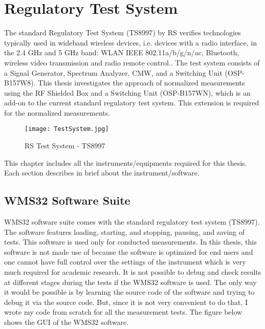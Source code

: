 \chapter{Regulatory Test System}  \label{chap:3}

The standard Regulatory Test System (TS8997) by \acs{RS}\textregistered{} verifies technologies typically used in wideband wireless devices, i.e. devices with a radio interface, in the 2.4 GHz and 5 GHz band: \acs{WLAN} \acs{IEEE} 802.11a/b/g/n/ac, Bluetooth\textregistered, wireless video transmission and radio remote control.\cite{ts8997}. 
The test system consists of a Signal Generator, Spectrum Analyzer,  \acf{CMW}, and a Switching Unit (\acs{OSP}-B157W8). This thesis investigates the approach of normalized measurements using the \acs{RF} Shielded Box and a Switching Unit (OSP-B157WN), which is an add-on to the current standard regulatory test system. This extension is required for the normalized measurements.

\begin{figure}[H]
\centering
\texttt{[image: TestSystem.jpg]}
\caption{\acs{RS}\textregistered{} Test System - TS8997 \cite{ts8997}}
\label{fig:testsystem}
\end{figure}

This chapter includes all the instruments/equipments required for this thesis. Each section describes in brief about the instrument/software.

\section{WMS32 Software Suite}
\label{sec:wms32}
WMS32 software suite comes with the standard regulatory test system (TS8997). The software features loading, starting, and stopping, pausing, and saving of tests. This software is used only for conducted measurements. In this thesis, this software is not made use of because the software is optimized for end users and one cannot have full control over the settings of the instrument which is very much required for academic research. It is not possible to debug and check results at different stages during the tests if the WMS32 software is used. The only way it would be possible is by learning the source code of the software and trying to debug it via the source code. But, since it is not very convenient to do that, I wrote my code from scratch for all the measurement tests. The figure below shows the \acs{GUI} of the WMS32 software.

